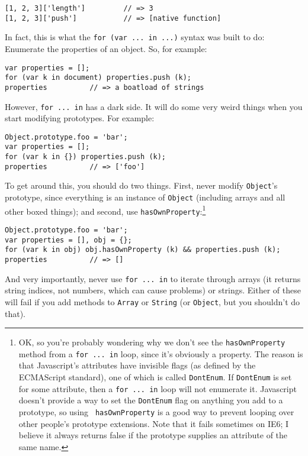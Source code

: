 \documentclass{article}
\begin{document}
\begin{verbatim}
[1, 2, 3]['length']         // => 3
[1, 2, 3]['push']           // => [native function]
\end{verbatim}

  In fact, this is what the \verb|for (var ... in ...)| syntax was built to do: Enumerate the properties of an object. So, for example:

\begin{verbatim}
var properties = [];
for (var k in document) properties.push (k);
properties          // => a boatload of strings
\end{verbatim}

  However, \verb|for ... in| has a dark side. It will do some very weird things when you start modifying prototypes. For example:

\begin{verbatim}
Object.prototype.foo = 'bar';
var properties = [];
for (var k in {}) properties.push (k);
properties          // => ['foo']
\end{verbatim}

  To get around this, you should do two things. First, never modify \verb|Object|'s prototype, since everything is an instance of \verb|Object| (including arrays and all other boxed things);
  and second, use \verb|hasOwnProperty|:\footnote{OK, so you're probably wondering why we don't see the {\tt hasOwnProperty} method from a {\tt for ... in} loop, since it's obviously a
  property. The reason is that Javascript's attributes have invisible flags (as defined by the ECMAScript standard), one of which is called {\tt DontEnum}. If {\tt DontEnum} is set for some
  attribute, then a {\tt for ... in} loop will not enumerate it. Javascript doesn't provide a way to set the {\tt DontEnum} flag on anything you add to a prototype, so using {\tt
  hasOwnProperty} is a good way to prevent looping over other people's prototype extensions. Note that it fails sometimes on IE6; I believe it always returns false if the prototype supplies an
  attribute of the same name.}

\begin{verbatim}
Object.prototype.foo = 'bar';
var properties = [], obj = {};
for (var k in obj) obj.hasOwnProperty (k) && properties.push (k);
properties          // => []
\end{verbatim}

  And very importantly, never use \verb|for ... in| to iterate through arrays (it returns string indices, not numbers, which can cause problems) or strings. Either of these will fail if you
  add methods to {\tt Array} or {\tt String} (or {\tt Object}, but you shouldn't do that).
\end{document}
